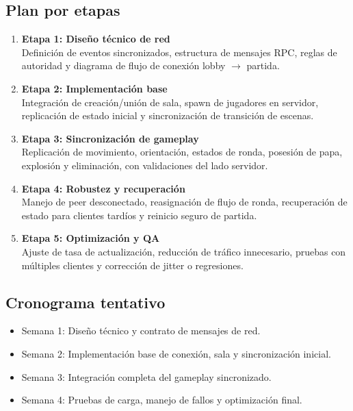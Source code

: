 \documentclass[11pt,a4paper]{article}
\begin{document}
\subsection{Plan por etapas}
\begin{enumerate}[nosep]
    \item \textbf{Etapa 1: Diseño técnico de red} \\
    Definición de eventos sincronizados, estructura de mensajes RPC, reglas de autoridad y diagrama de flujo de conexión lobby $\rightarrow$ partida.

    \item \textbf{Etapa 2: Implementación base} \\
    Integración de creación/unión de sala, spawn de jugadores en servidor, replicación de estado inicial y sincronización de transición de escenas.

    \item \textbf{Etapa 3: Sincronización de gameplay} \\
    Replicación de movimiento, orientación, estados de ronda, posesión de papa, explosión y eliminación, con validaciones del lado servidor.

    \item \textbf{Etapa 4: Robustez y recuperación} \\
    Manejo de peer desconectado, reasignación de flujo de ronda, recuperación de estado para clientes tardíos y reinicio seguro de partida.

    \item \textbf{Etapa 5: Optimización y QA} \\
    Ajuste de tasa de actualización, reducción de tráfico innecesario, pruebas con múltiples clientes y corrección de jitter o regresiones.
\end{enumerate}

\subsection{Cronograma tentativo}
\begin{itemize}[nosep]
    \item Semana 1: Diseño técnico y contrato de mensajes de red.
    \item Semana 2: Implementación base de conexión, sala y sincronización inicial.
    \item Semana 3: Integración completa del gameplay sincronizado.
    \item Semana 4: Pruebas de carga, manejo de fallos y optimización final.
\end{itemize}
\end{document}
